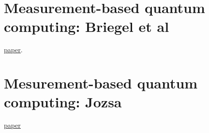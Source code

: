 \documentclass{book}
\theoremstyle{definition}
\begin{document}
%
%
%






\newpage



\section{Measurement-based quantum computing: Briegel et al}

\href{https://www.nature.com/articles/nphys1157.pdf}{\underline{paper}}.


\newpage


\section{Mesurement-based quantum computing: Jozsa}




\href{https://arxiv.org/pdf/quant-ph/0508124.pdf}{\underline{paper}}
\end{document}
